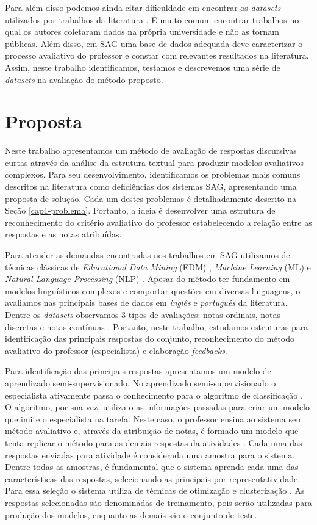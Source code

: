 Para além disso podemos ainda citar dificuldade em encontrar os \textit{datasets} utilizados por trabalhos da literatura \cite{burrows2015}. É muito comum encontrar trabalhos no qual os autores coletaram dados na própria universidade e não as tornam públicas. Além disso, em SAG uma base de dados adequada deve caracterizar o processo avaliativo do professor e constar com relevantes resultados na literatura. Assim, neste trabalho identificamos, testamos e descrevemos uma série de \textit{datasets} na avaliação do método proposto.

\section{Proposta}
\label{cap1-proposta}

Neste trabalho apresentamos um método de avaliação de respostas discursivas curtas através da análise da estrutura textual para produzir modelos avaliativos complexos. Para seu desenvolvimento, identificamos os problemas mais comuns descritos na literatura como deficiências dos sistemas SAG, apresentando uma proposta de solução. Cada um destes problemas é detalhadamente descrito na Seção \ref{cap1-problema}. Portanto, a ideia é desenvolver uma estrutura de reconhecimento do critério avaliativo do professor estabelecendo a relação entre as respostas e as notas atribuídas.


Para atender as demandas encontradas nos trabalhos em SAG utilizamos de técnicas clássicas de \textit{Educational Data Mining} (EDM) \cite{romero2010}, \textit{Machine Learning} (ML) \cite{han2011} e \textit{Natural Language Processing} (NLP) \cite{jurafsky2009}. Apesar do método ter fundamento em modelos linguísticos complexos e comportar questões em diversas linguagens, o avaliamos nas principais bases de dados em \textit{inglês} e \textit{português} da literatura. Dentre os \textit{datasets} observamos 3 tipos de avaliações: notas ordinais, notas discretas e notas contínuas \cite{morettin2010}. Portanto, neste trabalho, estudamos estruturas para identificação das principais respostas do conjunto, reconhecimento do método avaliativo do professor (especialista) e elaboração \textit{feedbacks}.

Para identificação das principais respostas apresentamos um modelo de aprendizado semi-supervisionado. No aprendizado semi-supervisionado o especialista ativamente passa o conhecimento para o algoritmo de classificação \cite{baeza2011}. O algoritmo, por sua vez, utiliza o as informações passadas para criar um modelo que imite o especialista na tarefa. Neste caso, o professor ensina ao sistema seu método avaliativo e, através da atribuição de notas, é formado um modelo que tenta replicar o método para as demais respostas da atividades \cite{romero2010}. Cada uma das respostas enviadas para atividade é considerada uma amostra para o sistema. Dentre todas as amostras, é fundamental que o sistema aprenda cada uma das características das respostas, selecionando as principais por representatividade. Para essa seleção o sistema utiliza de técnicas de otimização e clusterização \cite{everitt2011}. As respostas selecionadas são denominadas de treinamento, pois serão utilizadas para produção dos modelos, enquanto as demais são o conjunto de teste.

